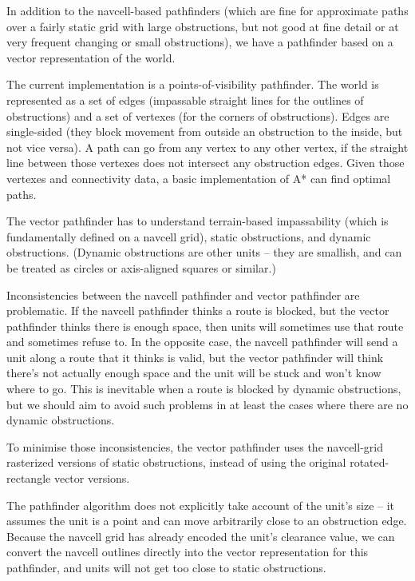\documentclass[a4paper,10pt]{article}
\begin{document}
In addition to the navcell-based pathfinders (which are fine for approximate paths
over a fairly static grid with large obstructions,
but not good at fine detail or at very frequent changing or small obstructions),
we have a pathfinder based on a vector representation of the world.

The current implementation is a points-of-visibility pathfinder.
The world is represented as a set of edges (impassable straight lines for the outlines of obstructions)
and a set of vertexes (for the corners of obstructions).
Edges are single-sided (they block movement from outside an obstruction to the inside,
but not vice versa).
A path can go from any vertex to any other vertex, if the straight line between those vertexes
does not intersect any obstruction edges.
Given those vertexes and connectivity data,
a basic implementation of A* can find optimal paths.

The vector pathfinder has to understand terrain-based impassability
(which is fundamentally defined on a navcell grid),
static obstructions, and dynamic obstructions.
(Dynamic obstructions are other units -- they are smallish,
and can be treated as circles or axis-aligned squares or similar.)

Inconsistencies between the navcell pathfinder and vector pathfinder are problematic.
If the navcell pathfinder thinks a route is blocked,
but the vector pathfinder thinks there is enough space,
then units will sometimes use that route and sometimes refuse to.
In the opposite case, the navcell pathfinder will send a unit along a route
that it thinks is valid,
but the vector pathfinder will think there's not actually enough space
and the unit will be stuck and won't know where to go.
This is inevitable when a route is blocked by dynamic obstructions,
but we should aim to avoid such problems in at least the cases where there are
no dynamic obstructions.

To minimise those inconsistencies,
the vector pathfinder uses the navcell-grid rasterized versions of static obstructions,
instead of using the original rotated-rectangle vector versions.

The pathfinder algorithm does not explicitly take account of the unit's size --
it assumes the unit is a point and can move arbitrarily close to an obstruction edge.
Because the navcell grid has already encoded the unit's clearance value,
we can convert the navcell outlines directly into the vector representation
for this pathfinder, and units will not get too close to static obstructions.
\end{document}
